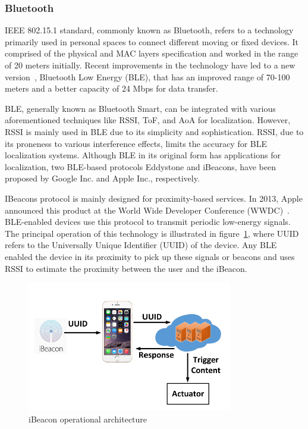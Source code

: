 \documentclass[a4paper,singleside,12pt]{report} %
\begin{document}
				\subsubsection{Bluetooth}

					IEEE 802.15.1 standard, commonly known as Bluetooth, refers to a technology primarily used in personal spaces to connect different moving or fixed devices. 
					It comprised of the physical and MAC layers specification and worked in the range of 20 meters initially. 
					Recent improvements in the technology have led to a new version~\cite{zafari2015microlocation}, Bluetooth Low Energy (BLE), that has an improved range of 70-100 meters and a better capacity of 24 Mbps for data transfer. 
					
					BLE, generally known as Bluetooth Smart, can be integrated with various aforementioned techniques like RSSI, ToF, and AoA for localization. 
					However, RSSI is mainly used in BLE due to its simplicity and sophistication. RSSI, due to its proneness to various interference effects, limits the accuracy for BLE localization systems. 
					Although BLE in its original form has applications for localization, two BLE-based protocols Eddystone and iBeacons, have been proposed by Google Inc. and Apple Inc., respectively. 
					
					IBeacons protocol is mainly designed for proximity-based services. 
					In 2013, Apple announced this product at the World Wide Developer Conference (WWDC)~\cite{apple-ibeacon}. BLE-enabled devices use this protocol to transmit periodic low-energy signals. 
					The principal operation of this technology is illustrated in figure~\ref{fig2.5}, where UUID refers to the Universally Unique Identifier (UUID) of the device. 
					Any BLE enabled the device in its proximity to pick up these signals or beacons and uses RSSI to estimate the proximity between the user and the iBeacon. 
					
					\begin{figure}[!htb]
					\centerline{\includegraphics[width=0.8\textwidth]{./figures/iBeacon-indoor-localization.png}}
					\caption{iBeacon operational architecture}
					\label{fig2.5}
					\end{figure}
					
\end{document}
